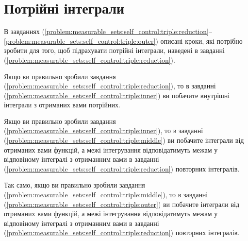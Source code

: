 \section{Потрійні інтеграли}
В завданнях (\ref{problem:measurable_sets:self_control:triple:reduction}--\ref{problem:measurable_sets:self_control:triple:outer}) описані кроки, які потрібно зробити для того, щоб підрахувати потрійні інтеграли, наведені в завданні  (\ref{problem:measurable_sets:self_control:triple:reduction}).

Якщо ви правильно зробили завдання  (\ref{problem:measurable_sets:self_control:triple:reduction}), то в завданні (\ref{problem:measurable_sets:self_control:triple:inner}) ви побачите внутрішні інтеграли з отриманих вами потрійних.

Якщо ви правильно зробили завдання  (\ref{problem:measurable_sets:self_control:triple:inner}), то в завданні (\ref{problem:measurable_sets:self_control:triple:middle}) ви побачите інтеграли від отриманих вами функцій, а межі інтегрування відповідатимуть межам у відповіному інтегралі з отриманним вами в завданні (\ref{problem:measurable_sets:self_control:triple:reduction}) повторних інтегралів.

Так само, якщо ви правильно зробили завдання  (\ref{problem:measurable_sets:self_control:triple:middle}), то в завданні (\ref{problem:measurable_sets:self_control:triple:outer}) ви побачите інтеграли від отриманих вами функцій, а межі інтегрування відповідатимуть межам у відповіному інтегралі з отриманним вами в завданні (\ref{problem:measurable_sets:self_control:triple:reduction}) повторних інтегралів.

